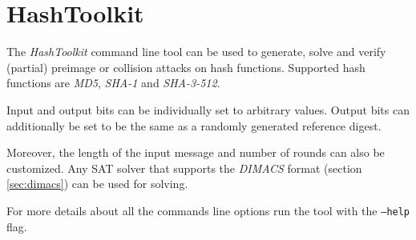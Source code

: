 \chapter{HashToolkit}
\label{apx:hashtoolkit}

The \emph{HashToolkit} command line tool can be used to generate, solve and verify (partial) preimage or collision attacks on hash functions.
Supported hash functions are \emph{MD5}, \emph{SHA-1} and \emph{SHA-3-512}.

Input and output bits can be individually set to arbitrary values.
Output bits can additionally be set to be the same as a randomly generated reference digest.

Moreover, the length of the input message and number of rounds can also be customized.
Any SAT solver that supports the \emph{DIMACS} format (section \ref{sec:dimacs}) can be used for solving.

For more details about all the commands line options run the tool with the \texttt{--help} flag.